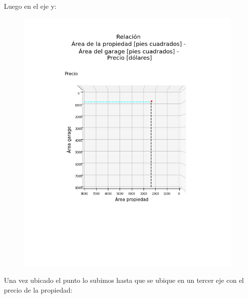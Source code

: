 \documentclass{article}
\begin{document}
\newpage
\newpage
Luego en el eje y:\\
\begin{figure}[h!]
\includegraphics[scale=0.5]{Imagenes/ubicacion_en_y.png}
\centering
\end{figure}
\newpage
Una vez ubicado el punto lo subimos hasta que se ubique en un tercer eje con el precio de la propiedad:\\
\end{document}
